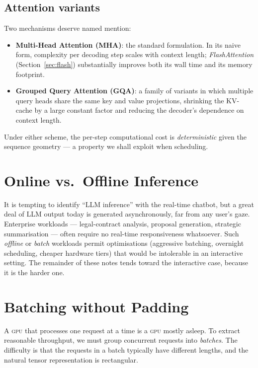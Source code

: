 \documentclass[11pt,a4paper]{article}
\theoremstyle{definition}
\theoremstyle{plain}
\newcommand{\GPU}{\textsc{gpu}}
\begin{document}
\subsection{Attention variants}

Two mechanisms deserve named mention:
\begin{itemize}[leftmargin=*,itemsep=2pt]
    \item \textbf{Multi-Head Attention (MHA)}: the standard formulation. In its naive form, complexity per decoding step scales with context length; \emph{FlashAttention} (Section~\ref{sec:flash}) substantially improves both its wall time and its memory footprint.
    \item \textbf{Grouped Query Attention (GQA)}: a family of variants in which multiple query heads share the same key and value projections, shrinking the KV-cache by a large constant factor and reducing the decoder's dependence on context length.
\end{itemize}
Under either scheme, the per-step computational cost is \emph{deterministic} given the sequence geometry --- a property we shall exploit when scheduling.

\section{Online vs.\ Offline Inference}


It is tempting to identify ``LLM inference'' with the real-time chatbot, but a great deal of LLM output today is generated asynchronously, far from any user's gaze. Enterprise workloads --- legal-contract analysis, proposal generation, strategic summarisation --- often require no real-time responsiveness whatsoever. Such \emph{offline} or \emph{batch} workloads permit optimisations (aggressive batching, overnight scheduling, cheaper hardware tiers) that would be intolerable in an interactive setting. The remainder of these notes tends toward the interactive case, because it is the harder one.

\section{Batching without Padding}

A \GPU{} that processes one request at a time is a \GPU{} mostly asleep. To extract reasonable throughput, we must group concurrent requests into \emph{batches}. The difficulty is that the requests in a batch typically have different lengths, and the natural tensor representation is rectangular.
\end{document}
